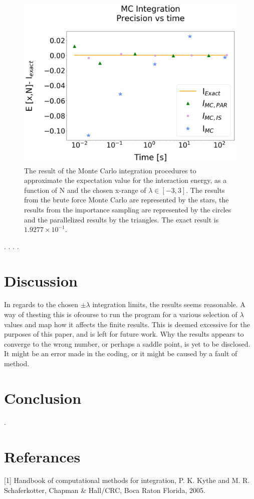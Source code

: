 \documentclass[%
reprint,
amsmath,amssymb,
aps,
]{revtex4-1}
\begin{document}
\begin{figure}[!h]
	\includegraphics[scale = 0.33]{MC_integration_PT.png}
	\caption{\label{mc} The result of the Monte Carlo integration procedures to approximate the expectation value for the interaction energy, as a function of N and the chosen x-range of $\lambda \in[-3,3]$. The results from the brute force Monte Carlo are represented by the stars, the results from the importance sampling are represented by the circles and the parallelized results by the triangles. The exact result is $1.9277\times 10^{-1}$. }
\end{figure}
\twocolumngrid
\newpage.
\newpage.
\newpage.
\newpage.
\newpage 
\section{Discussion}
In regards to the chosen $\pm \lambda$ integration limits, the results seems reasonable. A way of thesting this is ofcourse to run the program for a various selection of $\lambda$ values and map how it affects the finite results. This is deemed excessive for the purposes of this paper, and is left for future work. 
Why the results appears to converge to the wrong number, or perhaps a saddle point, is yet to be disclosed. It might be an error made in the coding, or it might be caused by a fault of method. 
\section{Conclusion }

\newpage. \newpage
\onecolumngrid
\section{Referances}
[1] Handbook of computational methods for integration, P. K. Kythe and M. R. Schaferkotter, Chapman \& Hall/CRC, Boca Raton Florida, 2005.
\newpage 
\end{document}
